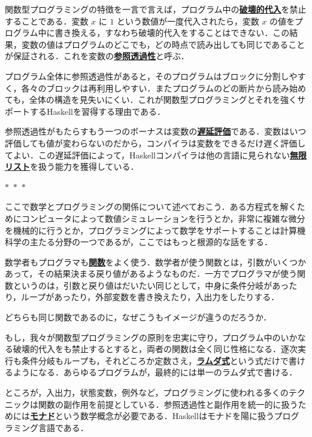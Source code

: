 \documentclass[a5paper,twoside,fleqn,draft]{jsbook}
\newcommand{\separator}{\begin{center}$*$~$*$~$*$\end{center}}
\newcommand{\programminglanguage}[1]{\textsf{#1}}
\newcommand{\haskell}{\programminglanguage{Haskell}}
\newcommand{\keyword}[1]{{\underline{\textbf{#1}}}}
\begin{document}
関数型プログラミングの特徴を一言で言えば，プログラム中の\keyword{破壊的代入}を禁止することである．変数 $x$ に $1$ という数値が一度代入されたら，変数 $x$ の値をプログラム中に書き換える，すなわち破壊的代入をすることはできない．この結果，変数の値はプログラムのどこでも，どの時点で読み出しても同じであることが保証される．これを変数の\keyword{参照透過性}と呼ぶ．

プログラム全体に参照透過性があると，そのプログラムはブロックに分割しやすく，各々のブロックは再利用しやすい．またプログラムのどの断片から読み始めても，全体の構造を見失いにくい．これが関数型プログラミングとそれを強くサポートする\haskell を習得する理由である．

参照透過性がもたらすもう一つのボーナスは変数の\keyword{遅延評価}である．変数はいつ評価しても値が変わらないのだから，コンパイラは変数をできるだけ遅く評価してよい．この遅延評価によって，\haskell コンパイラは他の言語に見られない\keyword{無限リスト}を扱う能力を獲得している．

\separator

ここで数学とプログラミングの関係について述べておこう．ある方程式を解くためにコンピュータによって数値シミュレーションを行うとか，非常に複雑な微分を機械的に行うとか，プログラミングによって数学をサポートすることは計算機科学の主たる分野の一つであるが，ここではもっと根源的な話をする．

数学者もプログラマも\keyword{関数}をよく使う．数学者が使う関数とは，引数がいくつかあって，その結果決まる戻り値があるようなものだ．一方でプログラマが使う関数というのは，引数と戻り値はだいたい同じとして，中身に条件分岐があったり，ループがあったり，外部変数を書き換えたり，入出力をしたりする．

どちらも同じ関数であるのに，なぜこうもイメージが違うのだろうか．

もし，我々が関数型プログラミングの原則を忠実に守り，プログラム中のいかなる破壊的代入をも禁止するとすると，両者の関数は全く同じ性格になる．逐次実行も条件分岐もループも，それどころか定数さえ，\keyword{ラムダ式}という式だけで書けるようになる．あらゆるプログラムが，最終的には単一のラムダ式で書ける．

ところが，入出力，状態変数，例外など，プログラミングに使われる多くのテクニックは関数の副作用を前提としている．参照透過性と副作用を統一的に扱うためには\keyword{モナド}という数学概念が必要である．\haskell はモナドを陽に扱うプログラミング言語である．


\end{document}
